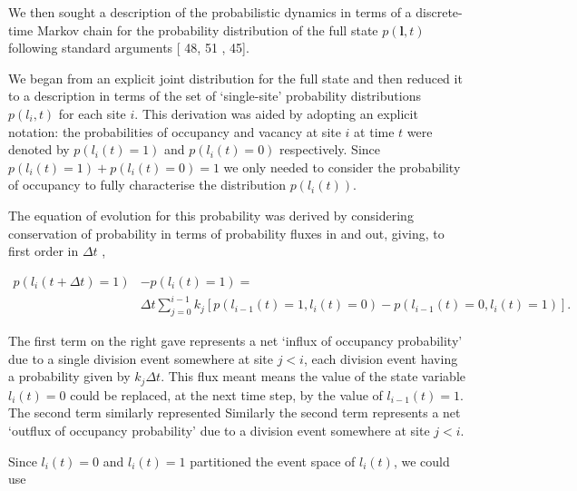 \documentclass[10pt,letterpaper]{article}
\providecommand{\DIFaddtex}[1]{{\protect\color{blue} \sf #1}} %
\providecommand{\DIFdeltex}[1]{{\protect\color{red} \scriptsize #1}} %
\providecommand{\DIFaddbegin}{} %
\providecommand{\DIFaddend}{} %
\providecommand{\DIFdelbegin}{} %
\providecommand{\DIFdelend}{} %
\providecommand{\DIFadd}[1]{\texorpdfstring{\DIFaddtex{#1}}{#1}} %
\providecommand{\DIFdel}[1]{\texorpdfstring{\DIFdeltex{#1}}{}} %
\begin{document}
\DIFdelend We then sought a description of
the probabilistic dynamics in terms of a discrete-time Markov chain for
the probability distribution of the full state \(p(\mathbf{l},t)\)
following standard arguments {[}\DIFdelbegin \DIFdel{48, 51}\DIFdelend \DIFaddbegin \DIFadd{43, 45}\DIFaddend {]}.

We began from an explicit joint distribution for the full state and then
reduced it to \DIFaddbegin \DIFadd{a }\DIFaddend description in terms of the set of `single-site'
probability distributions \(p(l_i,t)\) for each site \(i\). This
derivation was aided by adopting an explicit notation: the probabilities
of occupancy and vacancy at site \(i\) at time \(t\) were denoted by
\(p(l_i(t)=1)\) and \(p(l_i(t)=0)\) respectively. Since
\(p(l_i(t)=1)+ p(l_i(t)=0) = 1\) we only needed to consider the
probability of occupancy to fully characterise the distribution
\(p(l_i(t))\).

The equation of evolution for this probability was derived by
considering conservation of probability in terms of probability fluxes
in and out, giving, to first order in \(\Delta t\)\DIFaddbegin \DIFadd{,
}\DIFaddend 

\begin{align}p(l_i(t+\Delta t)=1) &- p(l_i(t)=1) = \nonumber \\ &\Delta t\sum_{j=0}^{i-1}k_j\left[p(l_{i-1}(t)=1,l_{i}(t)=0)-p(l_{i-1}(t)=0,l_{i}(t)=1)\right]. \end{align}

The first term on the right \DIFdelbegin \DIFdel{gave }\DIFdelend \DIFaddbegin \DIFadd{represents }\DIFaddend a net `influx of occupancy
probability' due to a single division event \DIFdelbegin \DIFdel{somewhere }\DIFdelend at site \(j < i\), each
division event having a probability \DIFdelbegin \DIFdel{given by }\DIFdelend \(k_j\Delta t\). This flux \DIFdelbegin \DIFdel{meant }\DIFdelend \DIFaddbegin \DIFadd{means }\DIFaddend the
value of the state variable \(l_i(t) = 0\) could be replaced, at the
next time step, by the value of \(l_{i-1}(t) = 1\). \DIFdelbegin \DIFdel{The second
term similarly represented }\DIFdelend \DIFaddbegin \DIFadd{Similarly the second
term represents }\DIFaddend a net `outflux of occupancy probability' due to a
division event \DIFdelbegin \DIFdel{somewhere }\DIFdelend at site \(j < i\). \DIFdelbegin %

\DIFdel{Since \(l_i(t)=0\) and \(l_i(t)=1\) partitioned the event space of
\(l_i(t)\), we could use
}%
\end{document}
